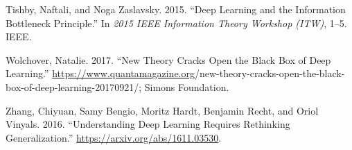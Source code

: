 \documentclass[
  letterpaper,
]{tufte-book}
\newlength{\cslhangindent}
\newlength{\cslentryspacingunit} %
\newenvironment{CSLReferences}[2] %
 {%
  \setlength{\parindent}{0pt}
  \ifodd #1
  \let\oldpar\par
  \def\par{\hangindent=\cslhangindent\oldpar}
  \fi
  \setlength{\parskip}{#2\cslentryspacingunit}
 }%
 {}
\begin{document}
\begin{CSLReferences}{1}{0}
\leavevmode{}%
Tishby, Naftali, and Noga Zaslavsky. 2015. {``Deep Learning and the
Information Bottleneck Principle.''} In \emph{2015 IEEE Information
Theory Workshop (ITW)}, 1--5. IEEE.

\leavevmode{}%
Wolchover, Natalie. 2017. {``New Theory Cracks Open the Black Box of
Deep Learning.''}
\url{https://www.quantamagazine.org}/new-theory-cracks-open-the-black-box-of-deep-learning-20170921/;
Simons Foundation.

\leavevmode{}%
Zhang, Chiyuan, Samy Bengio, Moritz Hardt, Benjamin Recht, and Oriol
Vinyals. 2016. {``Understanding Deep Learning Requires Rethinking
Generalization.''} \url{https://arxiv.org/abs/1611.03530}.

\end{CSLReferences}


\backmatter
\end{document}
